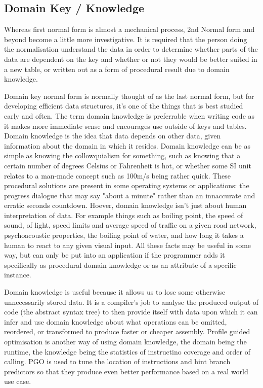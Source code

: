\subsection{Domain Key / Knowledge}

Whereas first normal form is almost a mechanical process, 2nd Normal form and
beyond become a little more investigative. It is required that the person doing
the normalisation understand the data in order to determine whether parts of
the data are dependent on the key and whether or not they would be better
suited in a new table, or written out as a form of procedural result due to
domain knowledge.

Domain key normal form is normally thought of as the last normal form, but for
developing efficient data structures, it's one of the things that is best
studied early and often. The term domain knowledge is preferrable when writing
code as it makes more immediate sense and encourages use outside of keys and
tables. Domain knowledge is the idea that data depends on other data, given
information about the domain in which it resides. Domain knowledge can be as
simple as knowing the collowquialism for something, such as knowing that a
certain number of degrees Celsius or Fahrenheit is hot, or whether some SI unit
relates to a man-made concept such as 100m/s being rather quick. These
procedural solutions are present in some operating systems or applications: the
progress dialogue that may say "about a minute" rather than an innaccurate and
erratic seconds countdown.  Hoever, domain knowledge isn't just about human
interpretation of data. For example things such as boiling point, the speed of
sound, of light, speed limits and average speed of traffic on a given road
network, psychoacoustic properties, the boiling point of water, and how long it
takes a human to react to any given visual input. All these facts may be useful
in some way, but can only be put into an application if the programmer adds it
specifically as procedural domain knowledge or as an attribute of a specific
instance.

Domain knowledge is useful because it allows us to lose some otherwise
unnecessarily stored data. It is a compiler's job to analyse the produced
output of code (the abstract syntax tree) to then provide itself with data upon
which it can infer and use domain knowledge about what operations can be
omitted, reordered, or transformed to produce faster or cheaper assembly.
Profile guided optimisation is another way of using domain knowledge, the
domain being the runtime, the knowledge being the statistics of instructino
coverage and order of calling. PGO is used to tune the location of instructions
and hint branch predictors so that they produce even better performance based
on a real world use case.

